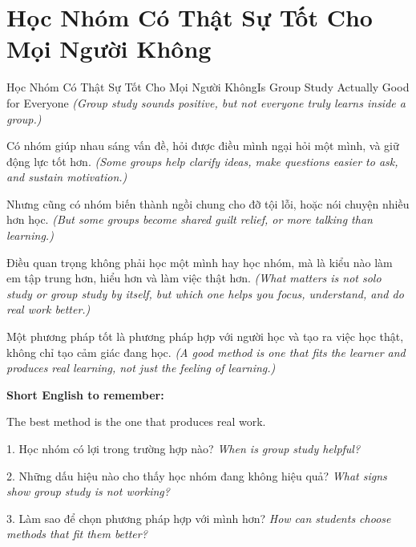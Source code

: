 \section{Học Nhóm Có Thật Sự Tốt Cho Mọi Người Không}
\begin{truyen}{Học Nhóm Có Thật Sự Tốt Cho Mọi Người Không}{Is Group Study Actually Good for Everyone}
\textit{(Group study sounds positive, but not everyone truly learns inside a group.)}

Có nhóm giúp nhau sáng vấn đề, hỏi được điều mình ngại hỏi một mình, và giữ động lực tốt hơn.
\textit{(Some groups help clarify ideas, make questions easier to ask, and sustain motivation.)}

Nhưng cũng có nhóm biến thành ngồi chung cho đỡ tội lỗi, hoặc nói chuyện nhiều hơn học.
\textit{(But some groups become shared guilt relief, or more talking than learning.)}

Điều quan trọng không phải học một mình hay học nhóm, mà là kiểu nào làm em tập trung hơn, hiểu hơn và làm việc thật hơn.
\textit{(What matters is not solo study or group study by itself, but which one helps you focus, understand, and do real work better.)}
\end{truyen}

\begin{baihoc}
Một phương pháp tốt là phương pháp hợp với người học và tạo ra việc học thật, không chỉ tạo cảm giác đang học.
\textit{(A good method is one that fits the learner and produces real learning, not just the feeling of learning.)}
\end{baihoc}

\begin{ghinhoanh}
\textbf{Short English to remember:}

The best method is the one that produces real work.

\end{ghinhoanh}

\begin{tuhocnhanh}
1. Học nhóm có lợi trong trường hợp nào? \textit{When is group study helpful?}

2. Những dấu hiệu nào cho thấy học nhóm đang không hiệu quả? \textit{What signs show group study is not working?}

3. Làm sao để chọn phương pháp hợp với mình hơn? \textit{How can students choose methods that fit them better?}
\end{tuhocnhanh}
\ngancach

